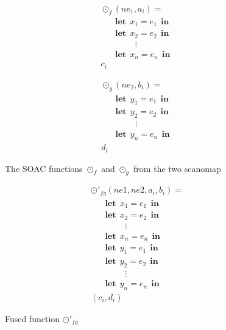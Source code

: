 \documentclass[11pt]{article}
\newcommand\lett{\phantom{-}\:\:\mathbf{let}\:\:}
\newcommand\inn{\:\:\mathbf{in}\:\:}
\begin{document}
\clearpage
 \begin{figure}[hb!]

   \begin{mdframed}
 \begin{minipage}{0.5\linewidth}
     \centering

       \begin{align*}
       &\odot_f(ne_1, a_i) = \\
       &\lett x_1 = e_1 \inn\\
       &\lett x_2 = e_2 \inn\\
       &\phantom{----}\vdots\\
       &\lett x_n = e_n \inn\\
       &c_i
       \end{align*}

     \label{fig:mapf}
 \end{minipage}
 \begin{minipage}{0.5\linewidth}
     \centering

     \begin{align*}
       &\odot_g(ne_2, b_i) = \\
       &\lett y_1 = e_1 \inn\\
       &\lett y_2 = e_2 \inn\\
       &\phantom{----}\vdots\\
       &\lett y_n = e_n \inn\\
       &d_i
     \end{align*}

     \label{fig:odotg}
   \end{minipage}

     \end{mdframed}
     \caption{The SOAC functions $\odot_f$ and $\odot_g$ from the two scanomap}
     \label{fig:pre-fusion}
\end{figure}

\begin{figure}[hb!]

   \begin{mdframed}
     \centering

       \begin{align*}
       &\odot'_{fg}(ne1, ne2, a_i, b_i ) = \\
       &\lett x_1 = e_1 \inn\\
       &\lett x_2 = e_2 \inn\\
       &\phantom{----}\vdots\\
       &\lett x_n = e_n \inn\\
       &\lett y_1 = e_1 \inn\\
       &\lett y_2 = e_2 \inn\\
       &\phantom{----}\vdots\\
       &\lett y_n = e_n \inn\\
       &(c_i, d_i)
       \end{align*}
       \end{mdframed}
     \caption{Fused function $\odot'_{fg}$}
     \label{fig:post-fusion}
\end{figure}
\end{document}

